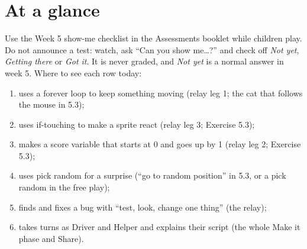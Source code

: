 \section{At a glance}
\begin{timeplan}
\end{timeplan}

\begin{teachernote}
Use the Week 5 show-me checklist in the Assessments booklet while children play. Do not announce a test: watch, ask \enquote{Can you show me\ldots?} and check off \emph{Not yet}, \emph{Getting there} or \emph{Got it}. It is never graded, and \emph{Not yet} is a normal answer in week 5. Where to see each row today:
\begin{enumerate}[leftmargin=1.4em,itemsep=0pt]
  \item uses a forever loop to keep something moving (relay leg 1; the cat that follows the mouse in 5.3);
  \item uses if-touching to make a sprite react (relay leg 3; Exercise 5.3);
  \item makes a score variable that starts at 0 and goes up by 1 (relay leg 2; Exercise 5.3);
  \item uses pick random for a surprise (\enquote{go to random position} in 5.3, or a pick random in the free play);
  \item finds and fixes a bug with \enquote{test, look, change one thing} (the relay);
  \item takes turns as Driver and Helper and explains their script (the whole Make it phase and Share).
\end{enumerate}
\end{teachernote}

